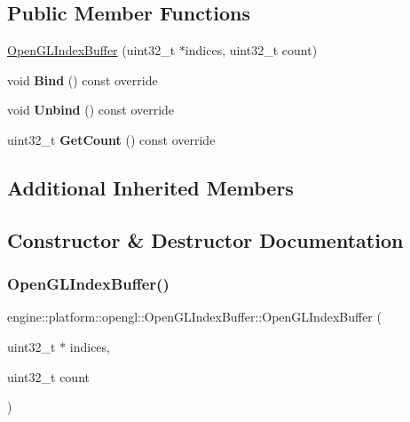 \subsection*{Public Member Functions}
\begin{DoxyCompactItemize}
\item
\hyperlink{classengine_1_1platform_1_1opengl_1_1OpenGLIndexBuffer_a88830d5185f3fd37d8274029f8d78746}{Open\+G\+L\+Index\+Buffer} (uint32\+\_\+t $\ast$indices, uint32\+\_\+t count)
\item
\mbox{\label{classengine_1_1platform_1_1opengl_1_1OpenGLIndexBuffer_ad9279e716132e186a38fe82814f29b0f}}
void {\bfseries Bind} () const override
\item
\mbox{\label{classengine_1_1platform_1_1opengl_1_1OpenGLIndexBuffer_a9fc400e4c464a2dbf7df76eba359639e}}
void {\bfseries Unbind} () const override
\item
\mbox{\label{classengine_1_1platform_1_1opengl_1_1OpenGLIndexBuffer_a2353743de19ca153e5e1123ef0132952}}
uint32\+\_\+t {\bfseries Get\+Count} () const override
\end{DoxyCompactItemize}
\subsection*{Additional Inherited Members}


\subsection{Constructor \& Destructor Documentation}
\mbox{\label{classengine_1_1platform_1_1opengl_1_1OpenGLIndexBuffer_a88830d5185f3fd37d8274029f8d78746}}
\subsubsection{\texorpdfstring{Open\+G\+L\+Index\+Buffer()}{OpenGLIndexBuffer()}}
{\footnotesize\ttfamily engine\+::platform\+::opengl\+::\+Open\+G\+L\+Index\+Buffer\+::\+Open\+G\+L\+Index\+Buffer (\begin{DoxyParamCaption}\item[{uint32\+\_\+t $\ast$}]{indices,  }\item[{uint32\+\_\+t}]{count }\end{DoxyParamCaption})}

